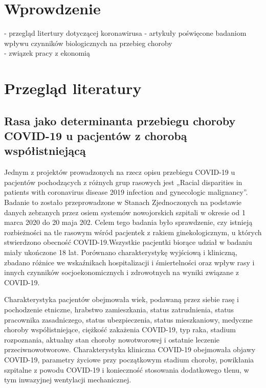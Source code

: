 \documentclass[polish, twoside, 12pt, a4paper]{article}
\theoremstyle{definition}
\theoremstyle{plain}
\theoremstyle{remark}
\begin{document}
\section{Wprowdzenie}

- przegląd litertury dotyczącej koronawirusa - artykuły poświęcone badaniom wpływu czynników biologicznych na przebieg choroby \\
- związek pracy z ekonomią \\

\cleardoublepage
\section{Przegląd literatury}
\subsection{Rasa jako determinanta przebiegu choroby COVID-19 u pacjentów z chorobą współistniejącą}

Jednym z projektów prowadzonych na rzecz opisu przebiegu COVID-19 u pacjentów pochodzących z różnych grup rasowych jest „Racial disparities in patients with coronavirus disease 2019 infection and gynecologic malignancy”. Badanie to zostało przeprowadzone w Stanach Zjednoczonych na podstawie danych zebranych przez osiem systemów nowojorskich szpitali w okresie od 1 marca 2020 do 20 maja 202. Celem tego badania było sprawdzenie, czy istnieją rozbieżności na tle rasowym wśród pacjentek z rakiem ginekologicznym, u których stwierdzono obecność COVID-19.Wszystkie pacjentki biorące udział w badaniu miały ukończone 18 lat. Porównano charakterystykę wyjściową i kliniczną, zbadano różnice we wskaźnikach hospitalizacji i śmiertelności oraz wpływ rasy i innych czynników socjoekonomicznych i zdrowotnych na wyniki związane z COVID-19. 

Charakterystyka pacjentów obejmowała wiek, podawaną przez siebie rasę i pochodzenie etniczne, hrabstwo zamieszkania, status zatrudnienia, status pracownika zasadniczego, status ubezpieczenia, status mieszkaniowy, medyczne choroby współistniejące, ciężkość zakażenia COVID-19, typ raka, stadium rozpoznania, aktualny stan choroby nowotworowej i ostatnie leczenie przeciwnowotworowe.  Charakterystyka kliniczna COVID-19 obejmowała objawy COVID-19, parametry życiowe przy początkowym stadium choroby, powikłania szpitalne z powodu COVID-19 i konieczność stosowania dodatkowego tlenu, w tym inwazyjnej wentylacji mechanicznej. 
\end{document}
